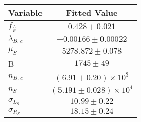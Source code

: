 \begin{tabular}[t]{lc}
\hline
Variable &Fitted Value\\
\hline\hline
$f_{\frac{L}{R}}$&$0.428\pm0.021$\\
\hline
$\lambda_{B,c}$&$-0.00166\pm0.00022$\\
\hline
$\mu_S$&$5278.872\pm0.078$\\
\hline
B&$1745\pm49$\\
\hline
$n_{B,c}$&$(6.91\pm0.20)\times 10^3$\\
\hline
$n_S$&$(5.191\pm0.028)\times 10^4$\\
\hline
$\sigma_{L_S}$&$10.99\pm0.22$\\
\hline
$\sigma_{R_S}$&$18.15\pm0.24$\\
\hline
\end{tabular}